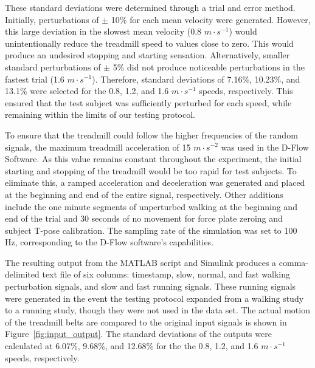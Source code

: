 \documentclass{article}
\begin{document}
These standard deviations were determined through a trial and error method.
Initially, perturbations of $\pm$ 10\% for each mean velocity were generated.
However, this large deviation in the slowest mean velocity (0.8 $m \cdot
s^{-1}$) would unintentionally reduce the treadmill speed to values close to
zero. This would produce an undesired stopping and starting sensation.
Alternatively, smaller standard perturbations of $\pm$ 5\% did not produce
noticeable perturbations in the fastest trial (1.6 $m \cdot s^{-1}$).
Therefore, standard deviations of 7.16\%, 10.23\%, and 13.1\% were selected for
the 0.8, 1.2, and 1.6 $m \cdot s^{-1}$ speeds, respectively.  This ensured that
the test subject was sufficiently perturbed for each speed, while remaining
within the limits of our testing protocol.

To ensure that the treadmill could follow the higher frequencies of the random
signals, the maximum treadmill acceleration of 15 $m \cdot s^{-2}$ was used in
the D-Flow Software. As this value remains constant throughout the experiment,
the initial starting and stopping of the treadmill would be too rapid for test
subjects. To eliminate this, a ramped acceleration and deceleration was
generated and placed at the beginning and end of the entire signal,
respectively. Other additions include the one minute segments of unperturbed
walking at the beginning and end of the trial and 30 seconds of no movement for
force plate zeroing and subject T-pose calibration.  The sampling rate of the
simulation was set to 100 Hz, corresponding to the D-Flow software's
capabilities.

The resulting output from the MATLAB script and Simulink produces a comma-
delimited text file of six columns: timestamp, slow, normal, and fast walking
perturbation signals, and slow and fast running signals.  These running signals
were generated in the event the testing protocol expanded from a walking study
to a running study, though they were not used in the data set.  The actual motion
of the treadmill belts are compared to the original input signals is shown in 
Figure~\ref{fig:input_output}.   The standard deviations of the outputs were 
calculated at 6.07\%, 9.68\%, and 12.68\% for the the 0.8, 1.2, and 
1.6 $m \cdot s^{-1}$ speeds, respectively. 
\end{document}
